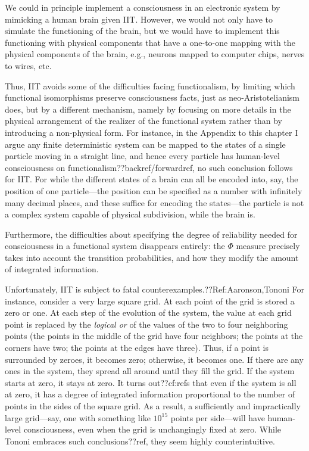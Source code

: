 We could in principle implement a consciousness in an electronic system by mimicking a human brain given IIT. However, we would 
not only have to simulate the functioning of the brain, but we would have to implement this functioning with  
physical components that have a one-to-one mapping with the physical components of the brain, e.g., neurons mapped to 
computer chips, nerves to wires, etc.

Thus, IIT avoids some of the difficulties facing functionalism, by limiting which functional isomorphisms 
preserve consciousness facts, just as neo-Aristotelianism does, but by a different mechanism, namely by focusing on
more details in the physical arrangement of the realizer of the functional system rather than by introducing a 
non-physical form. For instance, in the Appendix to this
chapter I argue any 
finite deterministic system can be mapped to the states of a single particle moving in a straight line, and 
hence every particle has human-level consciousness on functionalism??backref/forwardref, no such conclusion 
follows for IIT. For while the different states of a brain can all be encoded into, say, the position of one
particle---the position can be specified as a number with infinitely many decimal places, and these suffice
for encoding the states---the particle is not a complex system capable of physical subdivision, while the brain is. 

Furthermore, the difficulties about specifying the degree of reliability needed for consciousness in a functional
system disappears entirely: the $\Phi$ measure precisely takes into account the transition probabilities, and how
they modify the amount of integrated information.

Unfortunately, IIT is subject to fatal counterexamples.??Ref:Aaronson,Tononi For instance, consider a very large square grid.
At each point of the grid is stored a zero or one. At each step of the evolution of the system, the value at 
each grid point is replaced by the \textit{logical or} of the values of the two to four neighboring points (the 
points in the middle of the grid have four neighbors; the points at the corners have two; the points at the 
edges have three). Thus, if a point is surrounded by zeroes, it becomes zero; otherwise, it becomes one. If 
there are any ones in the system, they spread all around until they fill the grid. If the system starts at zero, 
it stays at zero. It turns out??cf:refs that even if the system is all at zero, it has a 
degree of integrated information proportional to the number of points in the sides of the square grid. As a 
result, a sufficiently and impractically large grid---say, one with something like $10^{15}$ points per side---will 
have human-level consciousness, even when the grid is unchangingly fixed at zero. While Tononi embraces such 
conclusions??ref, they seem highly counterintuitive.


